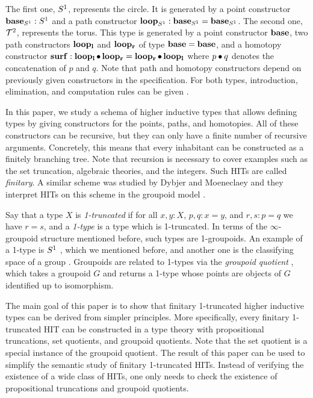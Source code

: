 The first one, $S^1$, represents the circle.
It is generated by a point constructor $\operatorname{\mathbf{base}}_{S^1} : S^1$ and a path constructor $\operatorname{\mathbf{loop}}_{S^1} : \operatorname{\mathbf{base}}_{S^1} = \operatorname{\mathbf{base}}_{S^1}$.
The second one, $\mathcal{T}^2$, represents the torus.
This type is generated by a point constructor $\operatorname{\mathbf{base}}$, two path constructors $\operatorname{\mathbf{loop_l}}$ and $\operatorname{\mathbf{loop_r}}$ of type $\operatorname{\mathbf{base}} = \operatorname{\mathbf{base}}$,
and a homotopy constructor $\operatorname{\mathbf{surf}} : \operatorname{\mathbf{loop_l}} \bullet \operatorname{\mathbf{loop_r}} = \operatorname{\mathbf{loop_r}} \bullet \operatorname{\mathbf{loop_l}}$
where $p \bullet q$ denotes the concatenation of $p$ and $q$.
Note that path and homotopy constructors depend on previously given constructors in the specification.
For both types, introduction, elimination, and computation rules can be given \cite{hottbook}.

In this paper, we study a schema of higher inductive types that allows defining types by
giving constructors for the points, paths, and homotopies.
All of these constructors can be recursive, but they can only have a finite number of recursive arguments.
Concretely, this means that every inhabitant can be constructed as a finitely branching tree.
Note that recursion is necessary to cover examples such as the set truncation, algebraic theories, and the integers.
Such HITs are called \emph{finitary}.
A similar scheme was studied by Dybjer and Moeneclaey
and they interpret HITs on this scheme in the groupoid model \cite{DBLP:journals/entcs/DybjerM18}.

Say that a type $X$ is \emph{1-truncated} if for all $x, y : X$, $p, q : x = y$, and $r, s : p = q$ we have $r = s$,
and a \emph{1-type} is a type which is 1-truncated.
In terms of the $\infty$-groupoid structure mentioned before, such types are 1-groupoids.
An example of a 1-type is $S^1$ \cite{LicataS13}, which we mentioned before,
and another one is the classifying space of a group \cite{LicataF14}.
Groupoids are related to 1-types via the \emph{groupoid quotient} \cite{sojakovaPhD},
which takes a groupoid $G$ and returns a 1-type
whose points are objects of $G$ identified up to isomorphism.

The main goal of this paper is to show that finitary 1-truncated higher inductive types can be derived from simpler principles.
More specifically, every finitary 1-truncated HIT can be constructed in a type theory
with propositional truncations, set quotients, and groupoid quotients.
Note that the set quotient is a special instance of the groupoid quotient.
The result of this paper can be used to simplify the semantic study of finitary 1-truncated HITs.
Instead of verifying the existence of a wide class of HITs, one only needs to check the existence
of propositional truncations and groupoid quotients.


